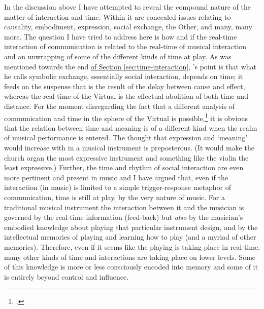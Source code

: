 
In the discussion above I have attempted to reveal the compound nature of the matter of interaction and time. Within it are concealed issues relating to causality, embodiment, expression, social exchange, the Other, and many, many more. The question I have tried to address here is how and if the real-time interaction of communication is related to the real-time of musical interaction and an unwrapping of some of the different kinds of time at play. As was mentioned towards the end \hyperlink{par:human-comp-inter:10}{of Section \ref*{sec:time-interaction}}, \citeauthor{baudrillard96}'s point is that what he calls symbolic exchange, essentially social interaction, depends on time; it feeds on the suspense that is the result of the delay between cause and effect, whereas the real-time of the Virtual is the effectual abolition of both time and distance. For the moment disregarding the fact that a different analysis of communication and time in the sphere of the Virtual is possible,\footcite[E.g.][chap. 11]{levy97} it is obvious that the relation between time and meaning is of a different kind when the realm of musical performance is entered. The thought that expression and `meaning' would increase with \emph{} in a musical instrument is preposterous. (It would make the church organ the most expressive instrument and something like the violin the least expressive.) Further, the time and rhythm of social interaction are even more pertinent and present in music and I have argued that, even if the interaction (in music) is limited to a simple trigger-response metaphor of communication, time is still at play, by the very nature of music. For a traditional musical instrument the interaction between it and the musician is governed by the real-time information (feed-back) but \emph{also} by the musician's embodied knowledge about playing that particular instrument design, and by the intellectual memories of playing and learning how to play (and a myriad of other memories). Therefore, even if it seems like the playing is taking place in real-time, many other kinds of time and interactions are taking place on lower levels. Some of this knowledge is more or less consciously encoded into memory and some of it is entirely beyond control and influence.


